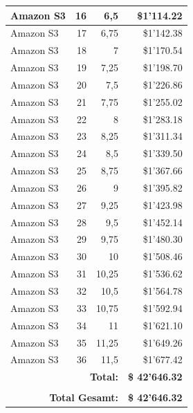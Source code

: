 \begin{table}
\begin{center}
\begin{tabular}{|l|r|r|r|}
Amazon S3 & 16 & 6,5 &  \$1'114.22  \\ \hline
Amazon S3 & 17 & 6,75 &  \$1'142.38  \\ \hline
Amazon S3 & 18 & 7 &  \$1'170.54  \\ \hline
Amazon S3 & 19 & 7,25 &  \$1'198.70  \\ \hline
Amazon S3 & 20 & 7,5 &  \$1'226.86  \\ \hline
Amazon S3 & 21 & 7,75 &  \$1'255.02  \\ \hline
Amazon S3 & 22 & 8 &  \$1'283.18  \\ \hline
Amazon S3 & 23 & 8,25 &  \$1'311.34  \\ \hline
Amazon S3 & 24 & 8,5 &  \$1'339.50  \\ \hline
Amazon S3 & 25 & 8,75 &  \$1'367.66  \\ \hline
Amazon S3 & 26 & 9 &  \$1'395.82  \\ \hline
Amazon S3 & 27 & 9,25 &  \$1'423.98  \\ \hline
Amazon S3 & 28 & 9,5 &  \$1'452.14  \\ \hline
Amazon S3 & 29 & 9,75 &  \$1'480.30  \\ \hline
Amazon S3 & 30 & 10 &  \$1'508.46  \\ \hline
Amazon S3 & 31 & 10,25 &  \$1'536.62  \\ \hline
Amazon S3 & 32 & 10,5 &  \$1'564.78  \\ \hline
Amazon S3 & 33 & 10,75 &  \$1'592.94  \\ \hline
Amazon S3 & 34 & 11 &  \$1'621.10  \\ \hline
Amazon S3 & 35 & 11,25 &  \$1'649.26  \\ \hline
Amazon S3 & 36 & 11,5 &  \$1'677.42  \\ \hline
\multicolumn{3}{r|}{\textbf{Total:}} & \textbf{\$ 42'646.32} \\ \cline{4-4}
\multicolumn{4}{c}{} \\  \cline{4-4}
\multicolumn{3}{r|}{\textbf{Total Gesamt:}} & \textbf{ \$ 42'646.32} \\ \cline{4-4}
\end{tabular}
\end{center}
\label{tab:KostenAmazonS3S1}
\end{table}

